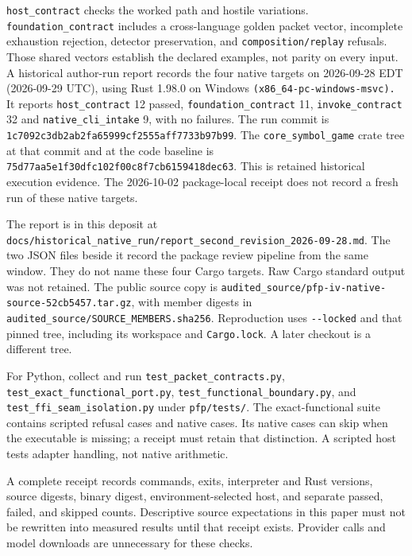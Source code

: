 \documentclass[
  11pt,
]{article}
\newcommand{\passthrough}[1]{#1}
\begin{document}
\nolinkurl{host_contract} checks the worked path and hostile variations.
\nolinkurl{foundation_contract} includes a cross-language golden packet
vector, incomplete exhaustion rejection, detector preservation, and
\nolinkurl{composition/replay} refusals. Those shared vectors establish
the declared examples, not parity on every input. A historical
author-run report records the four native targets on 2026-09-28 EDT
(2026-09-29 UTC), using Rust 1.98.0 on Windows
\nolinkurl{(x86_64-pc-windows-msvc).} It reports
\nolinkurl{host_contract} 12 passed, \nolinkurl{foundation_contract} 11,
\nolinkurl{invoke_contract} 32 and \nolinkurl{native_cli_intake} 9, with
no failures. The run commit is
\nolinkurl{1c7092c3db2ab2fa65999cf2555aff7733b97b99}. The
\nolinkurl{core_symbol_game} crate tree at that commit and at the code
baseline is \nolinkurl{75d77aa5e1f30dfc102f00c8f7cb6159418dec63}. This
is retained historical execution evidence. The 2026-10-02 package-local
receipt does not record a fresh run of these native targets.

The report is in this deposit at
\nolinkurl{docs/historical_native_run/report_second_revision_2026-09-28.md}.
The two JSON files beside it record the package review pipeline from the
same window. They do not name these four Cargo targets. Raw Cargo
standard output was not retained. The public source copy is
\nolinkurl{audited_source/pfp-iv-native-source-52cb5457.tar.gz}, with
member digests in \nolinkurl{audited_source/SOURCE_MEMBERS.sha256}.
Reproduction uses \passthrough{\lstinline!--locked!} and that pinned
tree, including its workspace and \passthrough{\lstinline!Cargo.lock!}.
A later checkout is a different tree.

For Python, collect and run \nolinkurl{test_packet_contracts.py},
\nolinkurl{test_exact_functional_port.py},
\nolinkurl{test_functional_boundary.py}, and
\nolinkurl{test_ffi_seam_isolation.py} under
\nolinkurl{pfp/tests/}. The exact-functional suite contains
scripted refusal cases and native cases. Its native cases can skip when
the executable is missing; a receipt must retain that distinction. A
scripted host tests adapter handling, not native arithmetic.

A complete receipt records commands, exits, interpreter and Rust
versions, source digests, binary digest, environment-selected host, and
separate passed, failed, and skipped counts. Descriptive source
expectations in this paper must not be rewritten into measured results
until that receipt exists. Provider calls and model downloads are
unnecessary for these checks.
\end{document}
